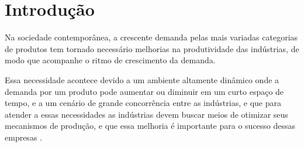 \chapter{Introdução}

Na sociedade contemporânea, a crescente demanda pelas mais variadas categorias de produtos tem tornado necessário melhorias na produtividade das indústrias, de modo que acompanhe o ritmo de crescimento da demanda.


Essa necessidade acontece devido a um ambiente altamente dinâmico onde a demanda por um produto pode aumentar ou diminuir em um curto espaço de tempo, e a um cenário de grande concorrência entre as indústrias, e que para atender a essas necessidades as indústrias devem buscar meios de otimizar seus mecanismos de produção, e que essa melhoria é importante para o sucesso dessas empresas \cite{Wari2016}.


